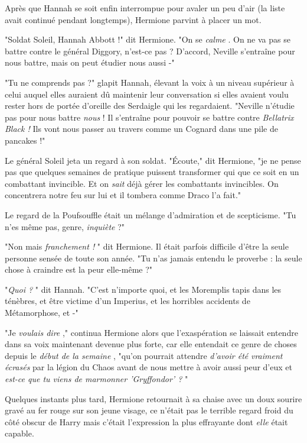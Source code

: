 Après que Hannah se soit enfin interrompue pour avaler un peu d'air (la liste avait continué pendant longtemps), Hermione parvint à placer un mot.

"Soldat Soleil, Hannah Abbott !" dit Hermione. "On se \emph{calme} . On ne va pas se battre contre le général Diggory, n'est-ce pas ? D'accord, Neville s'entraîne pour nous battre, mais on peut étudier nous aussi -"

"Tu ne comprends pas ?" glapit Hannah, élevant la voix à un niveau supérieur à celui auquel elles auraient dû maintenir leur conversation si elles avaient voulu rester hors de portée d'oreille des Serdaigle qui les regardaient. "Neville n'étudie pas pour nous battre \emph{nous}  ! Il s'entraîne pour pouvoir se battre contre \emph{Bellatrix Black !}  Ils vont nous passer au travers comme un Cognard dans une pile de pancakes !"

Le général Soleil jeta un regard à son soldat. "Écoute," dit Hermione, "je ne pense pas que quelques semaines de pratique puissent transformer qui que ce soit en un combattant invincible. Et on \emph{sait}  déjà gérer les combattants invincibles. On concentrera notre feu sur lui et il tombera comme Draco l'a fait."

Le regard de la Poufsouffle était un mélange d'admiration et de scepticisme. "Tu n'es même pas, genre, \emph{inquiète}  ?"

"Non mais \emph{franchement !} " dit Hermione. Il était parfois difficile d'être la seule personne sensée de toute son année. "Tu n'as jamais entendu le proverbe : la seule chose à craindre est la peur elle-même ?"

"\emph{Quoi ?} " dit Hannah. "C'est n'importe quoi, et les Moremplis tapis dans les ténèbres, et être victime d'un Imperius, et les horribles accidents de Métamorphose, et -"

"Je \emph{voulais dire} ," continua Hermione alors que l'exaspération se laissait entendre dans sa voix maintenant devenue plus forte, car elle entendait ce genre de choses depuis le \emph{début de la semaine} , "qu'on pourrait attendre \emph{d'avoir été}  \emph{vraiment}  \emph{écrasés } par la légion du Chaos avant de nous mettre à avoir aussi peur d'eux et \emph{est-ce que tu viens de marmonner 'Gryffondor' ?} "

Quelques instants plus tard, Hermione retournait à sa chaise avec un doux sourire gravé au fer rouge sur son jeune visage, ce n'était pas le terrible regard froid du côté obscur de Harry mais c'était l'expression la plus effrayante dont \emph{elle}  était capable.

